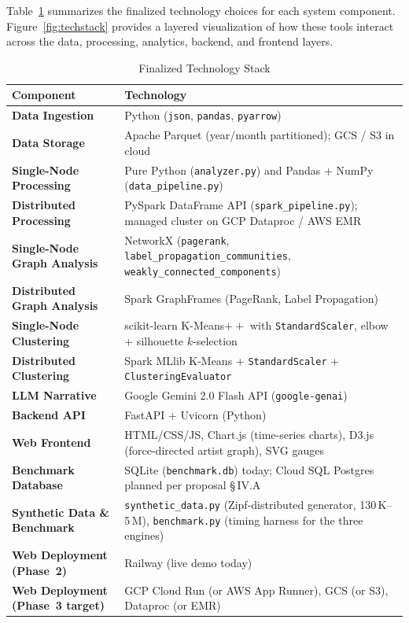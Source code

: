 \documentclass[conference]{IEEEtran}
\begin{document}
Table~\ref{tab:techstack} summarizes the finalized technology choices for each system component. Figure~\ref{fig:techstack} provides a layered visualization of how these tools interact across the data, processing, analytics, backend, and frontend layers.

\begin{table}[ht]
\centering
\caption{Finalized Technology Stack}
\label{tab:techstack}
\renewcommand{\arraystretch}{1.2}
\begin{tabular}{>{\bfseries}p{3.4cm} p{11.6cm}}
\toprule
Component & Technology \\
\midrule
Data Ingestion & Python (\texttt{json}, \texttt{pandas}, \texttt{pyarrow}) \\
Data Storage & Apache Parquet (year/month partitioned); GCS / S3 in cloud \\
Single-Node Processing & Pure Python (\texttt{analyzer.py}) and Pandas + NumPy (\texttt{data\_pipeline.py}) \\
Distributed Processing & PySpark DataFrame API (\texttt{spark\_pipeline.py}); managed cluster on GCP Dataproc / AWS EMR \\
Single-Node Graph Analysis & NetworkX (\texttt{pagerank}, \texttt{label\_propagation\_communities}, \texttt{weakly\_connected\_components}) \\
Distributed Graph Analysis & Spark GraphFrames (PageRank, Label Propagation) \\
Single-Node Clustering & scikit-learn K-Means$++$ with \texttt{StandardScaler}, elbow + silhouette $k$-selection \\
Distributed Clustering & Spark MLlib K-Means + \texttt{StandardScaler} + \texttt{ClusteringEvaluator} \\
LLM Narrative & Google Gemini 2.0 Flash API (\texttt{google-genai}) \\
Backend API & FastAPI + Uvicorn (Python) \\
Web Frontend & HTML/CSS/JS, Chart.js (time-series charts), D3.js (force-directed artist graph), SVG gauges \\
Benchmark Database & SQLite (\texttt{benchmark.db}) today; Cloud SQL Postgres planned per proposal \S\,IV.A \\
Synthetic Data \& Benchmark & \texttt{synthetic\_data.py} (Zipf-distributed generator, 130\,K--5\,M), \texttt{benchmark.py} (timing harness for the three engines) \\
Web Deployment (Phase~2) & Railway (live demo today) \\
Web Deployment (Phase~3 target) & GCP Cloud Run (or AWS App Runner), GCS (or S3), Dataproc (or EMR) \\
\bottomrule
\end{tabular}
\end{table}
\end{document}
